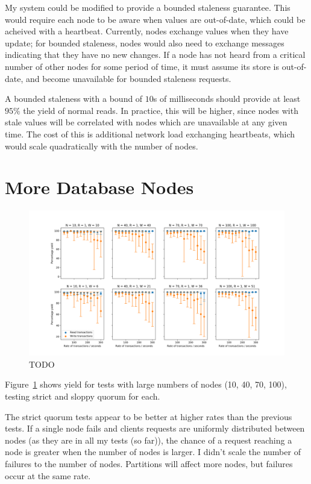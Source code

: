 \documentclass[12pt,a4paper,twoside,openany]{report}
\begin{document}
My system could be modified to provide a bounded staleness guarantee. This would require each node to be aware when values are out-of-date, which could be acheived with a heartbeat. Currently, nodes exchange values when they have update; for bounded staleness, nodes would also need to exchange messages indicating that they have no new changes. If a node has not heard from a critical number of other nodes for some period of time, it must assume its store is out-of-date, and become unavailable for bounded staleness requests.

A bounded staleness with a bound of $10$s of milliseconds should provide at least $95\%$ the yield of normal reads. In practice, this will be higher, since nodes with stale values will be correlated with nodes which are unavailable at any given time. The cost of this is additional network load exchanging heartbeats, which would scale quadratically with the number of nodes.

\section{More Database Nodes}

\begin{figure}[ht]
\centerline{\includegraphics[width=\paperwidth]{figs/big-n-yield.png}}
\caption{TODO}
\label{big-n-yield}
\end{figure}

Figure~\ref{big-n-yield} shows yield for tests with large numbers of nodes (10, 40, 70, 100), testing strict and sloppy quorum for each.

The strict quorum tests appear to be better at higher rates than the previous tests. If a single node fails and clients requests are uniformly distributed between nodes (as they are in all my tests (so far)), the chance of a request reaching a node is greater when the number of nodes is larger. I didn't scale the number of failures to the number of nodes. Partitions will affect more nodes, but failures occur at the same rate.
\end{document}
